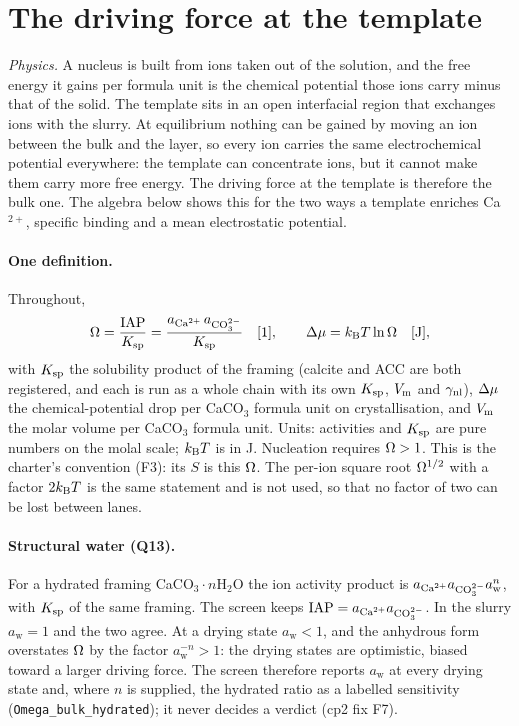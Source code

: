 \section{The driving force at the template}\label{th:sec:supersaturation}

\textit{Physics.} A nucleus is built from ions taken out of the solution, and the free energy it
gains per formula unit is the chemical potential those ions carry minus that of the solid. The
template sits in an open interfacial region that exchanges ions with the slurry. At equilibrium
nothing can be gained by moving an ion between the bulk and the layer, so every ion carries the
same electrochemical potential everywhere: the template can concentrate ions, but it cannot make
them carry more free energy. The driving force at the template is therefore the bulk one. The
algebra below shows this for the two ways a template enriches Ca$^{2+}$, specific binding and a
mean electrostatic potential.

\paragraph{One definition.} Throughout,
\begin{equation}\label{th:eq:omega}
\Omega=\frac{\mathrm{IAP}}{K_\mathrm{sp}}=\frac{a_{\mathrm{Ca}^{2+}}\,a_{\mathrm{CO}_3^{2-}}}{K_\mathrm{sp}} \quad[\mathrm{1}],\qquad \Delta\mu=k_\mathrm{B} T\ln\Omega \quad[\mathrm{J}],
\end{equation}
with $K_\mathrm{sp}$ the solubility product of the framing (calcite and ACC are both registered, and each is run as a whole chain with its own $K_\mathrm{sp}$, $V_\mathrm{m}$ and $\gamma_\mathrm{nl}$), $\Delta\mu$ the
chemical-potential drop per CaCO$_3$ formula unit on crystallisation, and $V_\mathrm{m}$ the molar volume per
CaCO$_3$ formula unit. Units: activities and $K_\mathrm{sp}$ are pure numbers on the molal scale; $k_\mathrm{B} T$ is
in J. Nucleation requires $\Omega>1$. This is the charter's convention (F3): its $S$ is this $\Omega$.
The per-ion square root $\Omega^{1/2}$ with a factor $2k_\mathrm{B} T$ is the same statement and is not used,
so that no factor of two can be lost between lanes.

\paragraph{Structural water (Q13).} For a hydrated framing CaCO$_3\cdot n$H$_2$O the ion activity
product is $a_{\mathrm{Ca}^{2+}}a_{\mathrm{CO}_3^{2-}} a_\mathrm{w}^{n}$, with $K_\mathrm{sp}$ of the same framing. The screen keeps
$\mathrm{IAP}=a_{\mathrm{Ca}^{2+}}a_{\mathrm{CO}_3^{2-}}$. In the slurry $a_\mathrm{w}=1$ and the two agree. At a drying state
$a_\mathrm{w}<1$, and the anhydrous form overstates $\Omega$ by the factor $a_\mathrm{w}^{-n}>1$: the
drying states are optimistic, biased toward a larger driving force. The screen therefore reports
$a_\mathrm{w}$ at every drying state and, where $n$ is supplied, the hydrated ratio as a labelled
sensitivity (\texttt{Omega\_bulk\_hydrated}); it never decides a verdict (cp2 fix F7).

